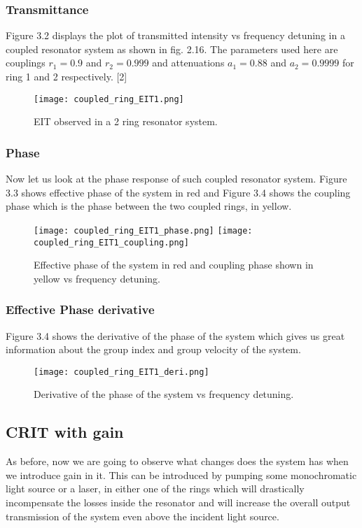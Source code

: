 \subsubsection{Transmittance}
Figure 3.2 displays the plot of transmitted intensity vs frequency detuning in a coupled resonator system as shown in fig. 2.16. The parameters used here are couplings $r_{1} = 0.9$ and $r_{2} = 0.999$ and attenuations $a_{1} = 0.88$ and $a_{2} = 0.9999$ for ring 1 and 2 respectively. [2]

\begin{figure}[h]
\centering
\texttt{[image: coupled\_ring\_EIT1.png]}
\caption{EIT observed in a 2 ring resonator system.}
\end{figure}

\subsubsection{Phase}

Now let us look at the phase response of such coupled resonator system. Figure 3.3 shows effective phase of the system in red and Figure 3.4 shows the coupling phase which is the phase between the two coupled rings, in yellow. 

\begin{figure}[h]
\texttt{[image: coupled\_ring\_EIT1\_phase.png]}
\texttt{[image: coupled\_ring\_EIT1\_coupling.png]}
\caption{Effective phase of the system in red and coupling phase shown in yellow vs frequency detuning.}
\end{figure}

\subsubsection{Effective Phase derivative}
Figure 3.4 shows the derivative of the phase of the system which gives us great information about the group index and group velocity of the system. 
\begin{figure}[h]
\centering
\texttt{[image: coupled\_ring\_EIT1\_deri.png]}
\caption{Derivative of the phase of the system vs frequency detuning.}
\end{figure}


\subsection{CRIT with gain}
As before, now we are going to observe what changes does the system has when we introduce gain in it. This can be introduced by pumping some monochromatic light source or a laser, in either one of the rings which will drastically incompensate the losses inside the resonator and will increase the overall output transmission of the system even above the incident light source. 
